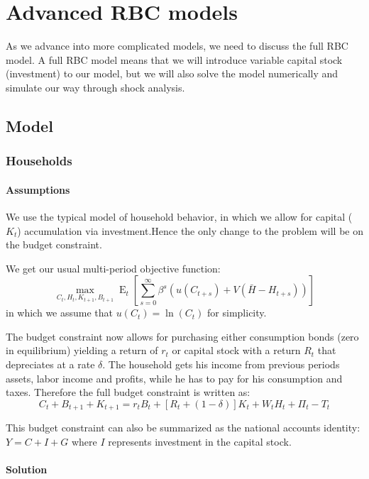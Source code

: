 \documentclass[12pt]{report}
\newcommand{\Et}[1]{\operatorname{E}_t\left[#1\right]}
\begin{document}
\chapter{Advanced RBC models}

As we advance into more complicated models, we need to discuss the full RBC model. A full RBC model means that we will introduce variable capital stock (investment) to our model, but we will also solve the  model numerically and simulate our way through shock analysis.

\section{Model}

\subsection{Households}

\subsubsection{Assumptions}

We use the typical model of household behavior, in which we allow for capital ($K_t$) accumulation via investment.Hence the only change to the problem will be on the budget constraint.

We get our usual multi-period objective function: $$\max_{C_t, H_t, K_{t+1}, B_{t+1}} \Et{\sum_{s=0}^{\infty} \beta^s \left( u(C_{t+s}) + V(\bar H - H_{t+s})\right)} $$ in which we assume that $u(C_t) = \ln(C_t)$ for simplicity. 

The budget constraint now allows for purchasing either consumption bonds (zero in equilibrium) yielding a return of $r_t$ or capital stock with a return $R_t$ that depreciates at a rate $\delta$. The household gets his income from previous periods assets, labor income and profits, while he has to pay for his consumption and taxes. Therefore the full budget constraint is written as: $$C_t + B_{t+1} + K_{t+1} = r_{t}B_t + [R_t + (1 - \delta)]K_t + W_tH_t + \Pi_t - T_t $$

This budget constraint can also be summarized as the national accounts identity: $Y = C + I + G$ where $I$ represents investment in the capital stock.

\subsubsection{Solution}
\end{document}
